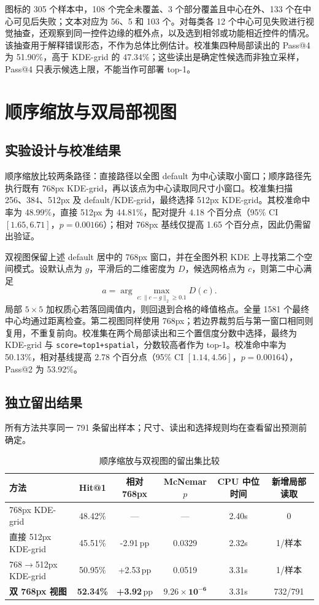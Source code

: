 \documentclass[UTF8,a4paper,11pt,fontset=none]{ctexart}
\newcommand{\pp}{\ensuremath{\,\mathrm{pp}}}
\newcommand{\code}[1]{\texttt{#1}}
\begin{document}
图标的 305 个样本中，108 个完全未覆盖、3 个部分覆盖且中心在外、133 个在中心可见后失败；文本对应为 56、5 和 103 个。对每类各 12 个中心可见失败进行视觉抽查，还观察到同一控件边缘的框外点，以及选到相邻或功能相近控件的情况。该抽查用于解释错误形态，不作为总体比例估计。校准集四种局部读出的 Pass@4 为 51.90\%，高于 KDE-grid 的 47.34\%；这些读出是确定性候选而非独立采样，Pass@4 只表示候选上限，不能当作可部署 top-1。

\section{顺序缩放与双局部视图}
\subsection{实验设计与校准结果}
顺序缩放比较两条路径：直接路径以全图 default 为中心读取小窗口；顺序路径先执行既有 768px KDE-grid，再以该点为中心读取同尺寸小窗口。校准集扫描 256、384、512px 及 default/KDE-grid，最终选择 512px KDE-grid。其校准命中率为 48.99\%，直接 512px 为 44.81\%，配对提升 4.18 个百分点（95\% CI $[1.65,6.71]$，$p=0.00166$）；相对 768px 基线仅提高 1.65 个百分点，因此仍需留出验证。

双视图保留上述 default 居中的 768px 窗口，并在全图外积 KDE 上寻找第二个空间模式。设默认点为 $g$，平滑后的二维密度为 $D$，候选网格点为 $c$，则第二中心满足
\begin{equation}
  a=\arg\max_{c:\lVert c-g\rVert_2\ge 0.1}D(c).
\end{equation}
局部 $5\times5$ 加权质心若落回阈值内，则回退到合格的峰值格点。全量 1581 个最终中心均通过距离检查。第二视图同样使用 768px；若边界裁剪后与第一窗口相同则复用，不重复前向。校准集在两个局部读出和三个置信度分数中选择，最终为 KDE-grid 与 \code{score=top1+spatial}，分数较高者作为 top-1。校准命中率为 50.13\%，相对基线提高 2.78 个百分点（95\% CI $[1.14,4.56]$，$p=0.00164$），Pass@2 为 53.92\%。

\subsection{独立留出结果}
所有方法共享同一 791 条留出样本；尺寸、读出和选择规则均在查看留出预测前确定。
\begin{table}[H]
\centering\small
\caption{顺序缩放与双视图的留出集比较}
\begin{tabular}{lccccc}
\toprule
方法 & Hit@1 & 相对 768px & McNemar $p$ & CPU 中位时间 & 新增局部读取 \\
\midrule
768px KDE-grid & 48.42\% & --- & --- & 2.40s & 0 \\
直接 512px KDE-grid & 45.51\% & -2.91\pp & 0.0329 & 2.32s & 1/样本 \\
768$\to$512px KDE-grid & 50.95\% & +2.53\pp & 0.0519 & 3.31s & 1/样本 \\
\textbf{双 768px 视图} & \textbf{52.34\%} & \textbf{+3.92\pp} & $\mathbf{9.26\times10^{-6}}$ & 3.31s & 732/791 \\
\bottomrule
\end{tabular}
\end{table}
\end{document}
